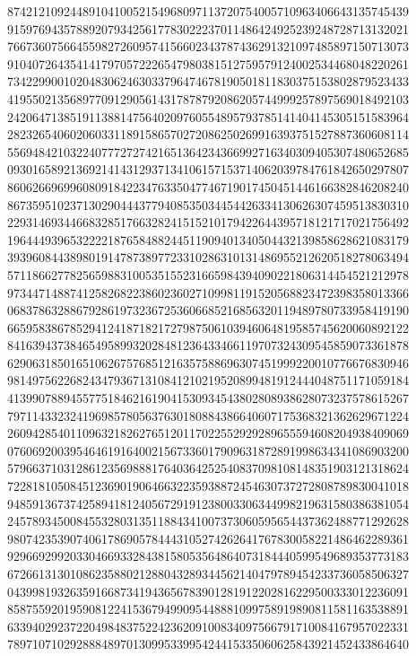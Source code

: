 {{    8742121092448910410052154968097113720754005710963406643135745439 ~
    9159769435788920793425617783022237011486424925239248728713132021 ~
    7667360756645598272609574156602343787436291321097485897150713073 ~
    9104072643541417970572226547980381512759579124002534468048220261 ~
    7342299001020483062463033796474678190501811830375153802879523433 ~
    4195502135689770912905614317878792086205744999257897569018492103 ~
    2420647138519113881475640209760554895793785141404145305151583964 ~
    2823265406020603311891586570272086250269916393751527887360608114 ~
    5569484210322407772727421651364234366992716340309405307480652685 ~
    0930165892136921414312937134106157153714062039784761842650297807 ~
    8606266969960809184223476335047746719017450451446166382846208240 ~
    8673595102371302904443779408535034454426334130626307459513830310 ~
    2293146934466832851766328241515210179422644395718121717021756492 ~
    1964449396532222187658488244511909401340504432139858628621083179 ~
    3939608443898019147873897723310286310131486955212620518278063494 ~
    5711866277825659883100535155231665984394090221806314454521212978 ~
    9734471488741258268223860236027109981191520568823472398358013366 ~
    0683786328867928619732367253606685216856320119489780733958419190 ~
    6659583867852941241871821727987506103946064819585745620060892122 ~
    8416394373846549589932028481236433466119707324309545859073361878 ~
    6290631850165106267576851216357588696307451999220010776676830946 ~
    9814975622682434793671310841210219520899481912444048751171059184 ~
    4139907889455775184621619041530934543802808938628073237578615267 ~
    7971143323241969857805637630180884386640607175368321362629671224 ~
    2609428540110963218262765120117022552929289655594608204938409069 ~
    0760692003954646191640021567336017909631872891998634341086903200 ~
    5796637103128612356988817640364252540837098108148351903121318624 ~
    7228181050845123690190646632235938872454630737272808789830041018 ~
    9485913673742589418124056729191238003306344998219631580386381054 ~
    2457893450084553280313511884341007373060595654437362488771292628 ~
    9807423539074061786905784443105274262641767830058221486462289361 ~
    9296692992033046693328438158053564864073184440599549689353773183 ~
    6726613130108623588021288043289344562140479789454233736058506327 ~
    0439981932635916687341943656783901281912202816229500333012236091 ~
    8587559201959081224153679499095448881099758919890811581163538891 ~
    6339402923722049848375224236209100834097566791710084167957022331 ~
    7897107102928884897013099533995424415335060625843921452433864640 ~
}}
